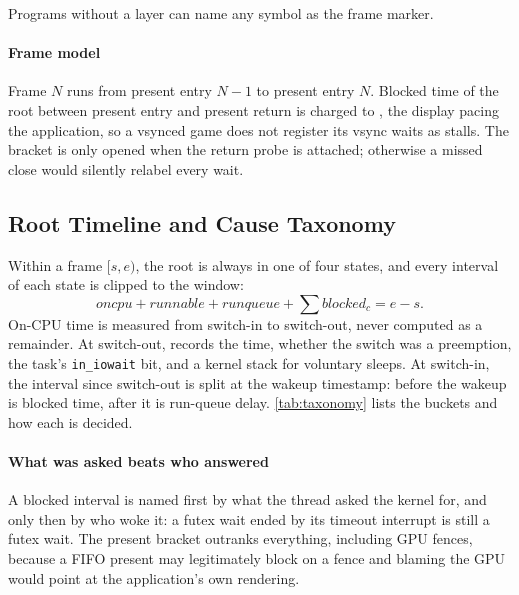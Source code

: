 Programs without a layer can name any symbol as the frame marker.

\paragraph{Frame model} Frame $N$ runs from present entry $N-1$ to present entry
$N$. Blocked time of the root between present entry and present return is
charged to , the display pacing the application, so a
vsynced game does not register its vsync waits as stalls. The bracket is
only opened when the return probe is attached; otherwise a missed close
would silently relabel every wait.

\subsection{Root Timeline and Cause Taxonomy}
\label{sec:taxonomy}

Within a frame $[s, e)$, the root is always in one of four states, and every
interval of each state is clipped to the window:
\begin{equation*}
\textit{oncpu} + \textit{runnable} + \textit{runqueue} + \textstyle\sum \textit{blocked}_c = e - s .
\end{equation*}
On-CPU time is measured from switch-in to switch-out, never computed as a
remainder. At switch-out, \sys records the time, whether the switch was a
preemption, the task's \texttt{in\_iowait} bit, and a kernel stack for
voluntary sleeps. At switch-in, the interval since switch-out is split at
the wakeup timestamp: before the wakeup is blocked time, after it is
run-queue delay. \autoref{tab:taxonomy} lists the buckets and how each is
decided.

\begin{table}[t]
\centering
\footnotesize

\caption{Root-timeline buckets, in the precedence order used for blocked
time. Together they partition the frame.}
\label{tab:taxonomy}
\end{table}

\paragraph{What was asked beats who answered} A blocked interval is named first
by what the thread asked the kernel for, and only then by who woke it: a
futex wait ended by its timeout interrupt is still a futex wait. The
present bracket outranks everything, including GPU fences, because a FIFO
present may legitimately block on a fence and blaming the GPU would point at
the application's own rendering.

